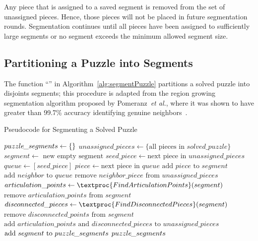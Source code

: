 Any piece that is assigned to a saved segment is removed from the set of unassigned pieces.  Hence, those pieces will not be placed in future segmentation rounds.  Segmentation continues until all pieces have been assigned to sufficiently large segments or no segment exceeds the minimum allowed segment size.

\subsection{Partitioning a Puzzle into Segments}\label{sec:segmentPuzzle}

The function ``'' in Algorithm~\ref{alg:segmentPuzzle} partitions a solved puzzle into disjoints segments; this procedure is adapted from the region growing segmentation algorithm proposed by Pomeranz~\textit{et al.}, where it was shown to have greater than 99.7\% accuracy identifying genuine neighbors~\cite{pomeranz2011}. 

\begin{algorithm}[t]
\caption{Pseudocode for Segmenting a Solved Puzzle}\label{alg:segmentPuzzle}
\begin{algorithmic}[1]
    \State $puzzle\hspace{-0.8pt}\_segments \gets \{ \}$
    \State $unassigned\_pieces \gets \{ \text{all pieces in } solved\_puzzle \}$
        \State $segment \gets \text{ new empty segment}$
        \State $seed\_piece \gets \text{next piece in } unassigned\_pieces$
        \State $queue \gets [seed\_piece]$
            \State $piece \gets \text{next piece in } queue$
            \State $\text{add } piece \text{ to } segment$
            		\State $\text{add } neighbor \text{ to } queue$
            		\State $\text{remove } neighbor\_piece \text{ from } unassigned\_pieces$
            	\EndIf
            \EndFor
        \EndWhile
        \State $articulation\_points \gets \textproc{FindArticulationPoints}(segment)$
        \State $\text{remove } articulation\_points \text{ from } \textit{segment}$
		\State $disconnected\_pieces \gets \textproc{FindDisconnectedPieces}(segment)$ 
		\State $\text{remove } disconnected\_points \text{ from } segment$
        \State $\text{add } \textit{articulation\_points} \text{ and } \textit{disconnected\_pieces} \text{ to } \textit{unassigned\_pieces}$               	
		\State $\text{add } segment \text{ to } puzzle\hspace{-0.8pt}\_segments$	
    \EndWhile
    \State \Return $puzzle\hspace{-0.8pt}\_segments$
\EndFunction
\end{algorithmic}
\end{algorithm}

